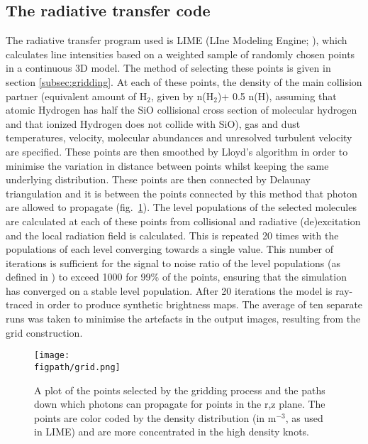 \documentclass[useAMS,usenatbib]{mn2e}
\newcommand{\figpath}{PFIGS/}
\begin{document}
\subsection{The radiative transfer code} \label{subsec:radiative_transfer_code}
The radiative transfer program used is LIME (LIne Modeling Engine; \citealt{Brinch:2010p13078}), which  calculates line intensities based on a weighted sample of randomly chosen points in a continuous 3D model. The method of selecting these points is given in section \ref{subsec:gridding}. At each of these points, the density of the main collision partner (equivalent amount of H$_2$, given by n(H$_2$)+ 0.5 n(H), assuming that atomic Hydrogen has half the SiO collisional cross section of molecular hydrogen and that ionized Hydrogen does not collide with SiO), gas and dust temperatures, velocity, molecular abundances and unresolved turbulent velocity are specified. These points are then smoothed by Lloyd's algorithm \citep{Lloyd1982} in order to minimise the variation in distance between points whilst keeping the same underlying distribution. These points are then connected by Delaunay triangulation and it is between the points connected by this method that photon are allowed to propagate (fig.~\ref{grid}). The level populations of the selected molecules are calculated at each of these points from collisional and radiative (de)excitation and the local radiation field is calculated. This is repeated 20 times with the populations of each level converging towards a single value. This number of iterations is sufficient for the signal to noise ratio of the level populations (as defined in \citealt{Brinch:2010p13078}) to exceed 1000 for 99\% of the points, ensuring that the simulation has converged on a stable level population. After 20 iterations the model is ray-traced in order to produce synthetic brightness maps. The average of ten separate runs was taken to minimise the artefacts in the output images, resulting from the grid construction.%


\begin{figure}
 \texttt{[image: \\figpath/grid.png]}
 \caption{A plot of the points selected by the gridding process and the paths down which photons can propagate for points in the r,z plane. The points are color coded by the density distribution (in m$^{-3}$, as used in LIME) and are more concentrated in the high density knots.}
\label{grid} %
\end{figure}
\end{document}
